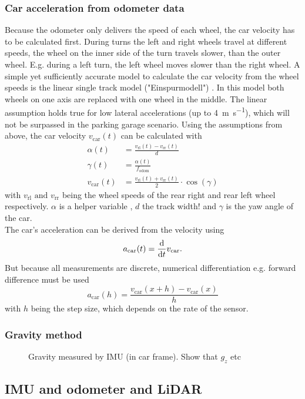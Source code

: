 \subsubsection{Car acceleration from odometer data}
Because the odometer only delivers the speed of each wheel, the car velocity has to be calculated first.
During turns the left and right wheels travel at different speeds, the wheel on the inner side of the turn travels slower, than the outer wheel.
E.g. during a left turn, the left wheel moves slower than the right wheel.
A simple yet sufficiently accurate model to calculate the car velocity from the wheel speeds is the linear single track model ("Einspurmodell") \cite{Mitschke2014}.
In this model both wheels on one axis are replaced with one wheel in the middle.
The linear assumption holds true for low lateral accelerations (up to \SI{4}{\metre\per\second}), which will not be surpassed in the parking garage scenario.
Using the assumptions from above, the car velocity $v_\mathrm{car}(t)$ can be calculated with
\begin{align}
    \alpha(t) &= \frac{v_\mathrm{rl}(t) - v_\mathrm{rr}(t)}{d} \\
    \gamma(t) &= \frac{\alpha(t)}{f_\mathrm{odom}} \\
    v_\mathrm{car}(t) &= \frac{v_\mathrm{rl}(t) + v_\mathrm{rr}(t)}{2}\cdot\cos(\gamma)
\end{align}
with $v_\mathrm{rl} \text{ and } v_\mathrm{rr}$ being the wheel speeds of the rear right and rear left wheel respectively.
$\alpha$ is a helper variable , $d$ the track width! and $\gamma$ is the yaw angle of the car.\\
The car's acceleration can be derived from the velocity using
\begin{equation}
    a_\mathrm{car}(t) = \dv{t}v_\mathrm{car}.
\end{equation}
But because all measurements are discrete, numerical differentiation e.g. forward difference must be used
\begin{equation}
    a_\mathrm{car}(h) = \frac{v_\mathrm{car}(x + h) - v_\mathrm{car}(x)}{h}
\end{equation}
with $h$ being the step size, which depends on the rate of the sensor.

\subsubsection{Gravity method}
\begin{figure}[htpb]
    \centering
    
    \caption{Gravity measured by IMU (in car frame). Show that $g_z$ etc}
    \label{fig:tikz_car_gravity}
\end{figure}


\subsection{IMU and odometer and LiDAR}
